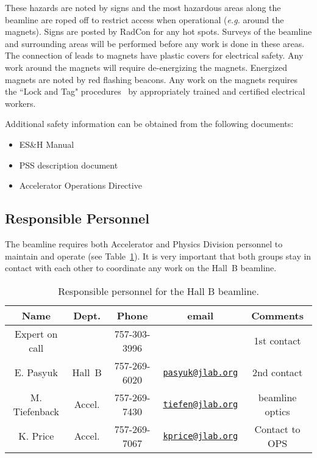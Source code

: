 These hazards are noted by signs and the most hazardous areas along the beamline are 
roped off to restrict access when operational ({\it e.g.} around the magnets). Signs are posted 
by RadCon for any hot spots. Surveys of the beamline and surrounding areas will be 
performed before any work is done in these areas. The connection of leads to magnets have 
plastic covers for electrical safety. Any work around the magnets will require 
de-energizing the magnets. Energized magnets are noted by red flashing beacons. Any work 
on the magnets requires the ``Lock and Tag" procedures~\cite{esh} by appropriately trained
and certified electrical workers.

Additional safety information can be obtained from the following documents:
\begin{itemize}[label=$\circ$]

\item ES\&H Manual~\cite{esh} 

\item PSS description document~\cite{pss}

\item Accelerator Operations Directive~\cite{ops}

\end{itemize} 

\subsection{Responsible Personnel}

The beamline requires both Accelerator and Physics Division personnel to maintain and 
operate (see Table~\ref{tb:beam}). It is very important that both groups stay in contact
with each other to coordinate any work on the Hall~B beamline. 

\begin{table}[!ht]
\centering
\begin{tabular}{|c|c|c|c|c|} \hline
 Name&Dept.&Phone&email&Comments \\ \hline
Expert on call& &757-303-3996&& 1st contact \\ \hline
E. Pasyuk  & Hall~B&757-269-6020&\href{mailto:pasyuk@jlab.org}{\nolinkurl{pasyuk@jlab.org}}&2nd contact \\ \hline
M. Tiefenback & Accel.&757-269-7430&\href{mailto:tiefen@jlab.org}{\nolinkurl{tiefen@jlab.org}}& beamline optics\\ \hline
K. Price      & Accel.&757-269-7067&\href{mailto:kprice@jlab.org}{\nolinkurl{kprice@jlab.org}}&Contact to OPS \\ \hline
\end{tabular}
\caption{Responsible personnel for the Hall B beamline.} 
\label{tb:beam}
\end{table}


